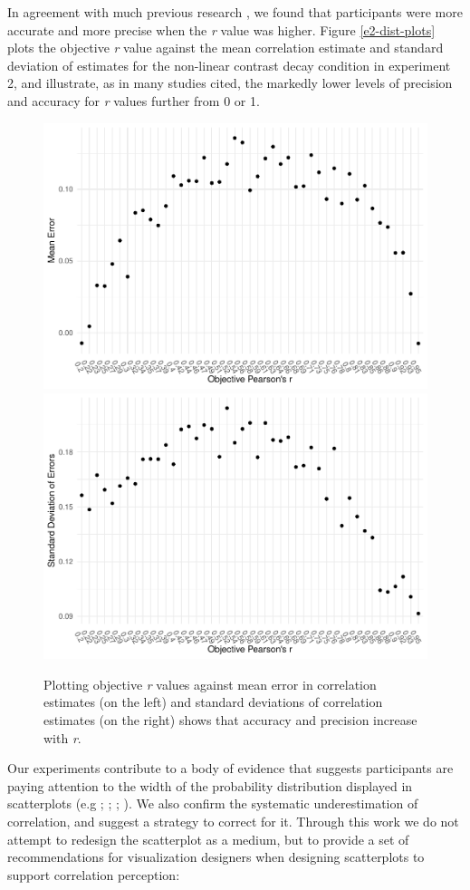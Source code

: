 \documentclass[preprint, 3p,
authoryear]{elsarticle} %
\begin{document}
In agreement with much previous research
\citep{rensink_2010, rensink_2012, rensink_2014, rensink_2017, pollack_1960},
we found that participants were more accurate and more precise when the
\emph{r} value was higher. Figure \ref{e2-dist-plots} plots the
objective \emph{r} value against the mean correlation estimate and
standard deviation of estimates for the non-linear contrast decay
condition in experiment 2, and illustrate, as in many studies cited, the
markedly lower levels of precision and accuracy for \emph{r} values
further from 0 or 1.

\begin{figure}
\includegraphics[width=0.5\linewidth]{contrast_and_scatterplots_files/figure-latex/e2-dist-plots-1} \includegraphics[width=0.5\linewidth]{contrast_and_scatterplots_files/figure-latex/e2-dist-plots-2} \caption{\label{e2-dist-plots}Plotting objective \textit{r} values against mean error in correlation estimates (on the left) and standard deviations of correlation estimates (on the right) shows that accuracy and precision increase with \textit{r}.}\label{fig:e2-dist-plots}
\end{figure}

Our experiments contribute to a body of evidence that suggests
participants are paying attention to the width of the probability
distribution displayed in scatterplots (e.g \citet{cleveland_1982};
\citet{meyer_1997}; \citet{yang_2019}; \citet{rensink_2017}). We also
confirm the systematic underestimation of correlation, and suggest a
strategy to correct for it. Through this work we do not attempt to
redesign the scatterplot as a medium, but to provide a set of
recommendations for visualization designers when designing scatterplots
to support correlation perception:
\end{document}
